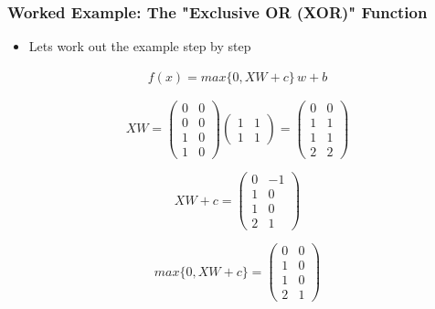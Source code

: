 \documentclass[
  shownotes,
  xcolor={svgnames},
  hyperref={colorlinks,citecolor=DarkBlue,linkcolor=DarkRed,urlcolor=DarkBlue}
  , aspectratio=169]{beamer}
\begin{document}
\begin{frame}
\frametitle{Worked Example: The "Exclusive OR (XOR)" Function}

\begin{itemize}
\item Lets work out the example step by step
\end{itemize}
\begin{align}
f(x)=max\{0,XW+c\}\,w+b
\end{align}

\[
XW=\left(\begin{array}{cc}
0 & 0\\
0 & 0\\
1 & 0\\
1 & 0
\end{array}\right)\left(\begin{array}{cc}
1 & 1\\
1 & 1
\end{array}\right)=\left(\begin{array}{cc}
0 & 0\\
1 & 1\\
1 & 1\\
2 & 2
\end{array}\right)
\]

\[
XW+c=\left(\begin{array}{cc}
0 & -1\\
1 & 0\\
1 & 0\\
2 & 1
\end{array}\right)
\]

\[
max\{0,XW+c\}=\left(\begin{array}{cc}
0 & 0\\
1 & 0\\
1 & 0\\
2 & 1
\end{array}\right)
\]

\end{frame}
\end{document}
